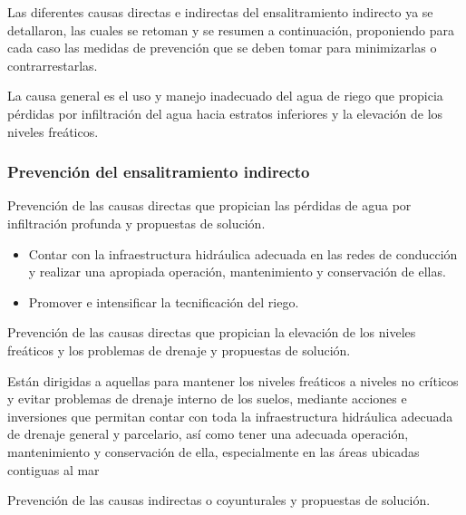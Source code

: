 Las diferentes causas directas e indirectas del ensalitramiento indirecto ya se detallaron, las cuales se retoman y se resumen a continuación, proponiendo para cada caso las medidas de prevención que se deben tomar para minimizarlas o contrarrestarlas.

La causa general es el uso y manejo inadecuado del agua de riego que propicia pérdidas por infiltración del agua hacia estratos inferiores y la elevación de los niveles freáticos.

\subsubsection{Prevención del ensalitramiento indirecto}
Prevención de las causas directas que propician las pérdidas de agua por infiltración profunda y propuestas de solución.
\begin{itemize}
    \item Contar con la infraestructura hidráulica adecuada en las redes de conducción y realizar una apropiada operación, mantenimiento y conservación de ellas.
    \item Promover e intensificar la tecnificación del riego.
\end{itemize}

Prevención de las causas directas que propician la elevación de los niveles freáticos y los problemas de drenaje y propuestas de solución.

Están dirigidas a aquellas para mantener los niveles freáticos a niveles no críticos y evitar problemas de drenaje interno de los suelos, mediante acciones e inversiones que permitan contar con toda la infraestructura hidráulica adecuada de drenaje general y parcelario, así como tener una adecuada operación, mantenimiento y conservación de ella, especialmente en las áreas ubicadas contiguas al mar

Prevención de las causas indirectas o coyunturales y propuestas de solución.

